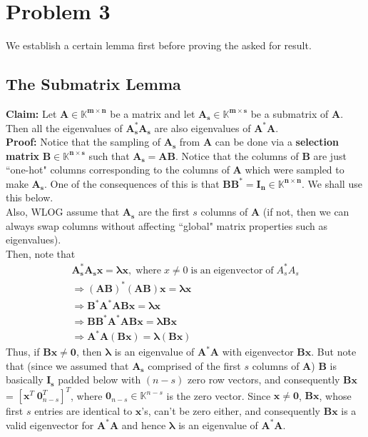 \documentclass[a4paper,11pt]{article}
\numberwithin{definition}{section}
\numberwithin{mytheorem}{subsection}
\begin{document}
\section{Problem 3}
We establish a certain lemma first before proving the asked for result.
\subsection{The Submatrix Lemma}
\textbf{Claim: } Let $\boldsymbol{A \in \mathbb{K}^{m\times n}}$ be a matrix and let $\boldsymbol{A_s \in \mathbb{K}^{m\times s}}$ be a submatrix of $\boldsymbol{A}$. Then all the eigenvalues of $\boldsymbol{A_s^{*}A_s}$ are also eigenvalues of $\boldsymbol{A^{*}A}$.\\
\textbf{Proof: } Notice that the sampling of $\boldsymbol{A_s}$ from $\boldsymbol{A}$ can be done via a \textbf{selection matrix} $\boldsymbol{B\in\mathbb{K}^{n\times s}}$ such that $\boldsymbol{A_s = AB}$. Notice that the columns of $\boldsymbol{B}$ are just ``one-hot" columns corresponding to the columns of $\boldsymbol{A}$ which were sampled to make $\boldsymbol{A_s}$. One of the consequences of this is that $\boldsymbol{BB^* = I_n \in \mathbb{K}^{n\times n}}$. We shall use this below.\\
Also, WLOG assume that $\boldsymbol{A_s}$ are the first $s$ columns of $\boldsymbol{A}$ (if not, then we can always swap columns without affecting ``global" matrix properties such as eigenvalues).\\
Then, note that 
\begin{gather*}
    \boldsymbol{A_s^*A_sx = \lambda x},\;\mathrm{where}\;x\neq 0\;\mathrm{is}\;\mathrm{an}\;\mathrm{eigenvector}\;\mathrm{of}\;A_s^*A_s \\
    \Rightarrow \boldsymbol{(AB)^*(AB)x = \lambda x} \\
    \Rightarrow \boldsymbol{B^*A^*ABx = \lambda x} \\
    \Rightarrow \boldsymbol{BB^*A^*ABx = \lambda Bx} \\
    \Rightarrow \boldsymbol{A^*A(Bx) = \lambda (Bx)}
\end{gather*}
Thus, if $\boldsymbol{Bx \neq 0}$, then $\boldsymbol{\lambda}$ is an eigenvalue of $\boldsymbol{A^*A}$ with eigenvector $\boldsymbol{Bx}$. But note that (since we assumed that $\boldsymbol{A_s}$ comprised of the first $s$ columns of $\boldsymbol{A}$) $\boldsymbol{B}$ is basically $\boldsymbol{I_s}$ padded below with $(n-s)$ zero row vectors, and consequently $\boldsymbol{Bx}$ = $[\boldsymbol{x}^T\;\boldsymbol{0}^T_{n-s}]^T$, where $\boldsymbol{0}_{n-s}\in\mathbb{K}^{n-s}$ is the zero vector. Since $\boldsymbol{x\neq 0}$, $\boldsymbol{Bx}$, whose first $s$ entries are identical to $\boldsymbol{x}$'s, can't be zero either, and consequently $\boldsymbol{Bx}$ is a valid eigenvector for $\boldsymbol{A^*A}$ and hence $\boldsymbol{\lambda}$ is an eigenvalue of $\boldsymbol{A^*A}$.\\
\end{document}
